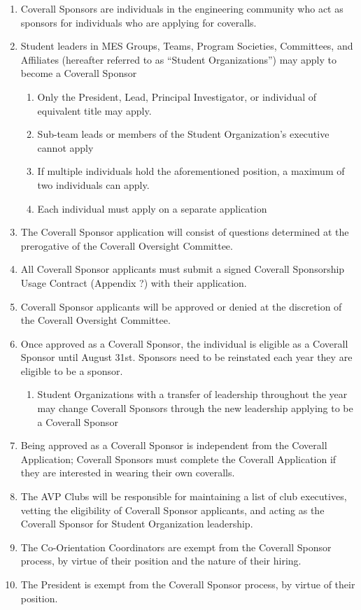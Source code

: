 \begin{enumerate}
 \item
  Coverall Sponsors are individuals in the engineering community who act
  as sponsors for individuals who are applying for coveralls.
 \item
  Student leaders in MES Groups, Teams, Program Societies, Committees,
  and Affiliates (hereafter referred to as ``Student Organizations'')
  may apply to become a Coverall Sponsor

  \begin{enumerate}
   \item
    Only the President, Lead, Principal Investigator, or individual of
    equivalent title may apply.
   \item
    Sub-team leads or members of the Student Organization's executive
    cannot apply
   \item
    If multiple individuals hold the aforementioned position, a maximum
    of two individuals can apply.
   \item
    Each individual must apply on a separate application
  \end{enumerate}
 \item
  The Coverall Sponsor application will consist of questions determined
  at the prerogative of the Coverall Oversight Committee.
 \item
  All Coverall Sponsor applicants must submit a signed Coverall
  Sponsorship Usage Contract (Appendix ?) with their application.
 \item
  Coverall Sponsor applicants will be approved or denied at the
  discretion of the Coverall Oversight Committee.
 \item
  Once approved as a Coverall Sponsor, the individual is eligible as a
  Coverall Sponsor until August 31st. Sponsors need to be reinstated
  each year they are eligible to be a sponsor.

  \begin{enumerate}
   \item
    Student Organizations with a transfer of leadership throughout the
    year may change Coverall Sponsors through the new leadership
    applying to be a Coverall Sponsor
  \end{enumerate}
 \item
  Being approved as a Coverall Sponsor is independent from the Coverall
  Application; Coverall Sponsors must complete the Coverall Application
  if they are interested in wearing their own coveralls.
 \item
  The AVP Clubs will be responsible for maintaining a list of club
  executives, vetting the eligibility of Coverall Sponsor applicants,
  and acting as the Coverall Sponsor for Student Organization
  leadership.
 \item
  The Co-Orientation Coordinators are exempt from the Coverall Sponsor
  process, by virtue of their position and the nature of their hiring.
 \item
  The President is exempt from the Coverall Sponsor process, by virtue
  of their position.

\end{enumerate}
